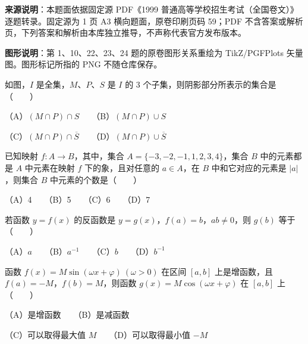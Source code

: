 


\begin{gktip}
\textbf{来源说明}：本题面依据固定源 PDF《1999 普通高等学校招生考试（全国卷文）》逐题转录。固定源为 1 页 A3 横向题面，原卷印刷页码 59；PDF 不含答案或解析页，下列答案和解析由本库独立推导，不声称代表官方发布版本。

\textbf{图形说明}：第 1、10、22、23、24 题的原卷图形关系重绘为 TikZ/PGFPlots 矢量图。图形标记所指的 PNG 不随仓库保存。
\end{gktip}

\Needspace{0.4\textheight}
\begin{question}
如图，$I$ 是全集，$M$、$P$、$S$ 是 $I$ 的 3 个子集，则阴影部分所表示的集合是\mbox{（　　）}
\nopagebreak[4]
\begin{center}\end{center}
\nopagebreak[4]
（A）$(M\cap P)\cap S$　　（B）$(M\cap P)\cup S$

（C）$(M\cap P)\cap\overline S$　　（D）$(M\cap P)\cup\overline S$

\end{question}
\begin{question}
已知映射 $f:A\to B$，其中，集合 $A=\{-3,-2,-1,1,2,3,4\}$，集合 $B$ 中的元素都是 $A$ 中元素在映射 $f$ 下的象，且对任意的 $a\in A$，在 $B$ 中和它对应的元素是 $|a|$，则集合 $B$ 中元素的个数是\mbox{（　　）}

（A）4　　（B）5　　（C）6　　（D）7

\end{question}
\begin{question}
若函数 $y=f(x)$ 的反函数是 $y=g(x)$，$f(a)=b$，$ab\ne0$，则 $g(b)$ 等于\mbox{（　　）}

（A）$a$　　（B）$a^{-1}$　　（C）$b$　　（D）$b^{-1}$

\end{question}
\begin{question}
函数 $f(x)=M\sin(\omega x+\varphi)\ (\omega>0)$ 在区间 $[a,b]$ 上是增函数，且 $f(a)=-M$，$f(b)=M$，则函数 $g(x)=M\cos(\omega x+\varphi)$ 在 $[a,b]$ 上\mbox{（　　）}

（A）是增函数　　（B）是减函数

（C）可以取得最大值 $M$　　（D）可以取得最小值 $-M$

\end{question}
